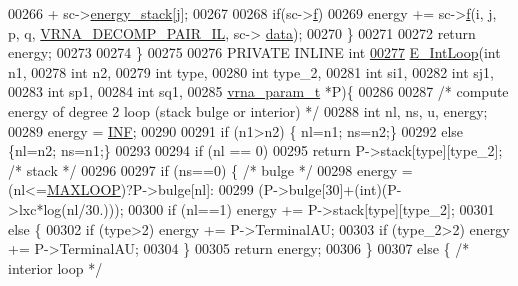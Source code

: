 \begin{DoxyCode}
00266                   + sc->\hyperlink{group__soft__constraints_ac20dded6068e81acd0f1139092f66a22}{energy\_stack}[j];
00267 
00268     \textcolor{keywordflow}{if}(sc->\hyperlink{group__soft__constraints_a32dc86090237888c75491bbd4861a04b}{f})
00269       energy += sc->\hyperlink{group__soft__constraints_a32dc86090237888c75491bbd4861a04b}{f}(i, j, p, q, \hyperlink{group__constraints_gaeab04f34d7730cff2d651d782f95d857}{VRNA\_DECOMP\_PAIR\_IL}, sc->
      \hyperlink{group__soft__constraints_a7574680143df97b9029146c2150bf06d}{data});
00270   \}
00271 
00272   \textcolor{keywordflow}{return} energy;
00273 
00274 \}
00275 
00276 PRIVATE INLINE \textcolor{keywordtype}{int}
\hypertarget{interior__loops_8h_source_l00277}{}\hyperlink{group__loops_ga0266d2c7a6098259280fb97e9f980b34}{00277} \hyperlink{group__loops_ga0266d2c7a6098259280fb97e9f980b34}{E\_IntLoop}(\textcolor{keywordtype}{int} n1,
00278           \textcolor{keywordtype}{int} n2,
00279           \textcolor{keywordtype}{int} type,
00280           \textcolor{keywordtype}{int} type\_2,
00281           \textcolor{keywordtype}{int} si1,
00282           \textcolor{keywordtype}{int} sj1,
00283           \textcolor{keywordtype}{int} sp1,
00284           \textcolor{keywordtype}{int} sq1,
00285           \hyperlink{group__energy__parameters_structvrna__param__s}{vrna\_param\_t} *P)\{
00286 
00287   \textcolor{comment}{/* compute energy of degree 2 loop (stack bulge or interior) */}
00288   \textcolor{keywordtype}{int} nl, ns, u, energy;
00289   energy = \hyperlink{energy__const_8h_a12c2040f25d8e3a7b9e1c2024c618cb6}{INF};
00290 
00291   \textcolor{keywordflow}{if} (n1>n2) \{ nl=n1; ns=n2;\}
00292   \textcolor{keywordflow}{else} \{nl=n2; ns=n1;\}
00293 
00294   \textcolor{keywordflow}{if} (nl == 0)
00295     \textcolor{keywordflow}{return} P->stack[type][type\_2];  \textcolor{comment}{/* stack */}
00296 
00297   \textcolor{keywordflow}{if} (ns==0) \{                      \textcolor{comment}{/* bulge */}
00298     energy = (nl<=\hyperlink{energy__const_8h_ad1bd6eabac419670ddd3c9ed82145988}{MAXLOOP})?P->bulge[nl]:
00299       (P->bulge[30]+(\textcolor{keywordtype}{int})(P->lxc*log(nl/30.)));
00300     \textcolor{keywordflow}{if} (nl==1) energy += P->stack[type][type\_2];
00301     \textcolor{keywordflow}{else} \{
00302       \textcolor{keywordflow}{if} (type>2) energy += P->TerminalAU;
00303       \textcolor{keywordflow}{if} (type\_2>2) energy += P->TerminalAU;
00304     \}
00305     \textcolor{keywordflow}{return} energy;
00306   \}
00307   \textcolor{keywordflow}{else} \{                            \textcolor{comment}{/* interior loop */}

\end{DoxyCode}
